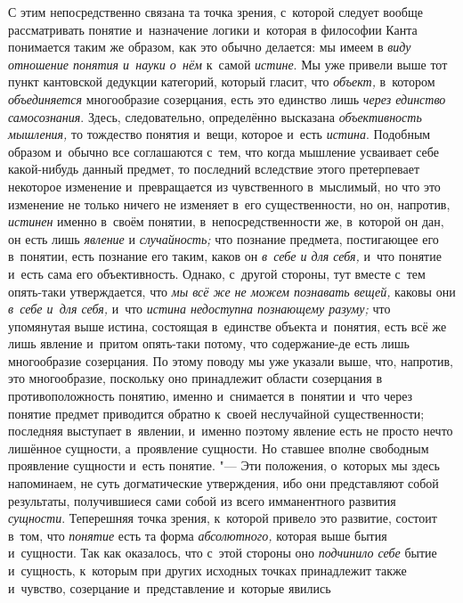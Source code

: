 С этим непосредственно связана та точка зрения, с~которой
следует вообще рассматривать понятие и~назначение логики и~которая в
философии Канта понимается таким же образом, как это обычно делается: мы
имеем в {\em виду отношение понятия и~науки о~нём} к~самой {\em истине}. Мы уже
привели выше тот пункт кантовской дедукции категорий, который гласит, что
{\em объект,} в~котором {\em объединяется}
многообразие созерцания, есть это единство лишь
{\em через единство самосознания}. Здесь, следовательно, определённо высказана
{\em объективность мышления,} то тождество понятия и~вещи, которое и~есть
{\em истина}. Подобным
образом и~обычно все соглашаются с~тем, что когда мышление усваивает себе
какой-нибудь данный предмет, то последний вследствие этого претерпевает
некоторое изменение и~превращается из чувственного в~мыслимый, но что это
изменение не только ничего не изменяет в~его существенности, но он,
напротив, {\em истинен}
именно в~своём понятии, в~непосредственности же, в~которой он
дан, он есть лишь {\em явление} и {\em случайность;}
что познание предмета, постигающее его в~понятии, есть
познание его таким, каков он {\em в~себе
и для себя,} и~что понятие и~есть сама его объективность.
Однако, с~другой стороны, тут вместе с~тем опять-таки
утверждается,
что {\em мы всё же не можем познавать вещей,} каковы они
{\em в~себе и~для себя,} и~что {\em истина
недоступна познающему разуму;} что упомянутая выше
истина, состоящая в~единстве объекта и~понятия, есть всё же
лишь явление и~притом опять-таки потому, что содержание-де есть лишь
многообразие созерцания. По этому поводу мы уже указали выше, что,
напротив, это многообразие, поскольку оно принадлежит области созерцания в
противоположность понятию, именно и~снимается в~понятии и~что через понятие
предмет приводится обратно к~своей неслучайной существенности; последняя
выступает в~явлении, и~именно поэтому явление есть не просто нечто лишённое
сущности, а~проявление сущности. Но ставшее вполне свободным проявление
сущности и~есть понятие. "--- Эти положения, о~которых мы здесь
напоминаем, не суть догматические утверждения, ибо они представляют собой
результаты, получившиеся сами собой из всего имманентного развития
{\em сущности}. Теперешняя точка зрения, к~которой привело это развитие,
состоит в~том, что {\em понятие} есть та форма {\em абсолютного,}
которая выше бытия и~сущности. Так как оказалось, что с~этой
стороны оно {\em подчинило себе}
бытие и~сущность, к~которым при других исходных точках
принадлежит также и~чувство, созерцание и~представление и~которые явились
